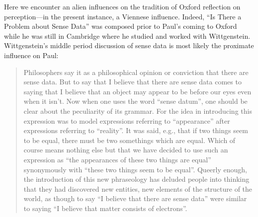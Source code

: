 \documentclass[11pt]{article}
\begin{document}
Here we encounter an alien influences on the tradition of Oxford reflection on perception---in the present instance, a Viennese influence. Indeed, ``Is There a Problem about Sense Data'' was composed prior to Paul's coming to Oxford while he was still in Cambridge where he studied and worked with Wittgenstein. 
Wittgenstein's middle period discussion of sense data is most likely the proximate influence on Paul:
\begin{quote}
	Philosophers say it as a philosophical opinion or conviction that there are sense data. But to say that I believe that there are sense data comes to saying that I believe that an object may appear to be before our eyes even when it isn't. Now when one uses the word ``sense datum'', one should be clear about the peculiarity of its grammar. For the idea in introducing this expression was to model expressions referring to ``appearance'' after expressions referring to ``reality''. It was said, e.g., that if two things seem to be equal, there must be two somethings which are equal. Which of course means nothing else but that we have decided to use such an expression as ``the appearances of these two things are equal'' synonymously with ``these two things seem to be equal''. Queerly enough, the introduction of this new phraseology has deluded people into thinking that they had discovered new entities, new elements of the structure of the world, as though to say ``I believe that there are sense data'' were similar to saying ``I believe that matter consists of electrons''. \citep[70]{Wittgenstein:1958rr}
\end{quote}
\end{document}
